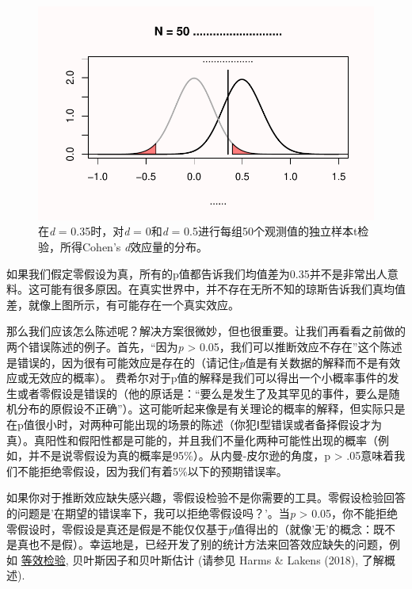 \documentclass[
  letterpaper,
  DIV=11,
  numbers=noendperiod]{scrreprt}
\begin{document}
\begin{figure}

{\centering \includegraphics[width=1\textwidth,height=\textheight]{01-pvalue_files/figure-pdf/fig-fig136-1.pdf}

}

\caption{\label{fig-fig136}在\emph{d} = 0.35时，对\emph{d} = 0和\emph{d}
= 0.5进行每组50个观测值的独立样本t检验，所得Cohen's
\emph{d}效应量的分布。}

\end{figure}

如果我们假定零假设为真，所有的p值都告诉我们均值差为0.35并不是非常出人意料。这可能有很多原因。在真实世界中，并不存在无所不知的琼斯告诉我们真均值差，就像上图所示，有可能存在一个真实效应。

那么我们应该怎么陈述呢？解决方案很微妙，但也很重要。让我们再看看之前做的两个错误陈述的例子。首先，``因为\emph{p}
\textgreater{}
0.05，我们可以推断效应不存在''这个陈述是错误的，因为很有可能效应是存在的（请记住\emph{p}值是有关数据的解释而不是有效应或无效应的概率）。
费希尔对于p值的解释是我们可以得出一个小概率事件的发生或者零假设是错误的（他的原话是：``要么是发生了及其罕见的事件，要么是随机分布的原假设不正确''）。这可能听起来像是有关理论的概率的解释，但实际只是在p值很小时，对两种可能出现的场景的陈述（你犯Ⅰ型错误或者备择假设才为真）。真阳性和假阳性都是可能的，并且我们不量化两种可能性出现的概率（例如，并不是说零假设为真的概率是95\%）。从内曼-皮尔逊的角度，p
\textgreater{}
.05意味着我们不能拒绝零假设，因为我们有着5\%以下的预期错误率。

如果你对于推断效应缺失感兴趣，零假设检验不是你需要的工具。零假设检验回答的问题是'在期望的错误率下，我可以拒绝零假设吗？'。当\emph{p}
\textgreater{}
0.05，你不能拒绝零假设时，零假设是真还是假是不能仅仅基于\emph{p}值得出的（就像'无'的概念：既不是真也不是假）。幸运地是，已经开发了别的统计方法来回答效应缺失的问题，例如
\protect\hyperlink{equivalencetest}{等效检验}, 贝叶斯因子和贝叶斯估计
(请参见 Harms \& Lakens (2018), 了解概述).
\end{document}
